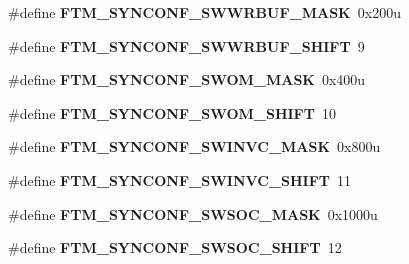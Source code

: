 \begin{DoxyCompactItemize}
\item 
\#define {\bfseries F\+T\+M\+\_\+\+S\+Y\+N\+C\+O\+N\+F\+\_\+\+S\+W\+W\+R\+B\+U\+F\+\_\+\+M\+A\+SK}~0x200u\hypertarget{group__FTM__Register__Masks_ga36811ec448ab628c5157dabf3c62381e}{}\label{group__FTM__Register__Masks_ga36811ec448ab628c5157dabf3c62381e}

\item 
\#define {\bfseries F\+T\+M\+\_\+\+S\+Y\+N\+C\+O\+N\+F\+\_\+\+S\+W\+W\+R\+B\+U\+F\+\_\+\+S\+H\+I\+FT}~9\hypertarget{group__FTM__Register__Masks_ga7e637f85f9c1208956b53b41549e7d87}{}\label{group__FTM__Register__Masks_ga7e637f85f9c1208956b53b41549e7d87}

\item 
\#define {\bfseries F\+T\+M\+\_\+\+S\+Y\+N\+C\+O\+N\+F\+\_\+\+S\+W\+O\+M\+\_\+\+M\+A\+SK}~0x400u\hypertarget{group__FTM__Register__Masks_ga83a5f269c2d4504f783db9f73465447c}{}\label{group__FTM__Register__Masks_ga83a5f269c2d4504f783db9f73465447c}

\item 
\#define {\bfseries F\+T\+M\+\_\+\+S\+Y\+N\+C\+O\+N\+F\+\_\+\+S\+W\+O\+M\+\_\+\+S\+H\+I\+FT}~10\hypertarget{group__FTM__Register__Masks_ga2e240c4c97396948369a13ec27c0f038}{}\label{group__FTM__Register__Masks_ga2e240c4c97396948369a13ec27c0f038}

\item 
\#define {\bfseries F\+T\+M\+\_\+\+S\+Y\+N\+C\+O\+N\+F\+\_\+\+S\+W\+I\+N\+V\+C\+\_\+\+M\+A\+SK}~0x800u\hypertarget{group__FTM__Register__Masks_ga6b91d1ec9cfd8e992734eab0b764fa50}{}\label{group__FTM__Register__Masks_ga6b91d1ec9cfd8e992734eab0b764fa50}

\item 
\#define {\bfseries F\+T\+M\+\_\+\+S\+Y\+N\+C\+O\+N\+F\+\_\+\+S\+W\+I\+N\+V\+C\+\_\+\+S\+H\+I\+FT}~11\hypertarget{group__FTM__Register__Masks_ga1b9db3f75907123978450cf63605621b}{}\label{group__FTM__Register__Masks_ga1b9db3f75907123978450cf63605621b}

\item 
\#define {\bfseries F\+T\+M\+\_\+\+S\+Y\+N\+C\+O\+N\+F\+\_\+\+S\+W\+S\+O\+C\+\_\+\+M\+A\+SK}~0x1000u\hypertarget{group__FTM__Register__Masks_ga33a4f7326defaab9414315649e467ff5}{}\label{group__FTM__Register__Masks_ga33a4f7326defaab9414315649e467ff5}

\item 
\#define {\bfseries F\+T\+M\+\_\+\+S\+Y\+N\+C\+O\+N\+F\+\_\+\+S\+W\+S\+O\+C\+\_\+\+S\+H\+I\+FT}~12\hypertarget{group__FTM__Register__Masks_gaabae406b076dd71660d85bef42d47fb1}{}\label{group__FTM__Register__Masks_gaabae406b076dd71660d85bef42d47fb1}


\end{DoxyCompactItemize}
